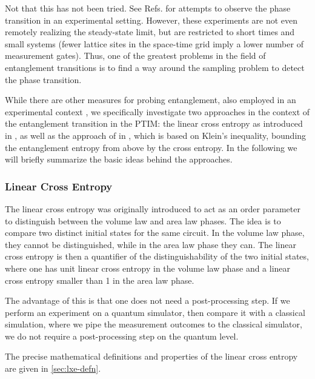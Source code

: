 Not that this has not been tried. See Refs.
\cite{noelMeasurementinducedQuantumPhases2022,kohExperimentalRealizationMeasurementInduced2022,kamakariExperimentalDemonstrationScalable2024}
for attempts to observe the phase transition in an experimental setting.
However, these experiments are not even remotely realizing the steady-state
limit, but are restricted to short times and small systems (fewer lattice sites
in the space-time grid imply a lower number of measurement gates). Thus, one of
the greatest problems in the field of entanglement transitions is to find a way
around the sampling problem to detect the phase transition.

While there are other measures for probing entanglement, also employed in an
experimental context
\cite{joshiObservingQuantumMpemba2024,aresEntanglementAsymmetryProbe2023}, we
specifically investigate two approaches in the context of the entanglement
transition in the PTIM: the linear cross entropy as introduced in
\cite{liCrossEntropyBenchmark2023}, as well as the approach of
\citeauthor{garrattProbingPostmeasurementEntanglement2023} in
\cite{garrattProbingPostmeasurementEntanglement2023}, which is based on Klein's
inequality, bounding the entanglement entropy from above by the cross entropy.
In the following we will briefly summarize the basic ideas behind the
approaches.

\subsubsection{Linear Cross Entropy}

The linear cross entropy was originally introduced to act as an order parameter
to distinguish between the volume law and area law phases. The idea is to
compare two distinct initial states for the same circuit. In the volume law
phase, they cannot be distinguished, while in the area law phase they can.  The
linear cross entropy is then a quantifier of the distinguishability of the two
initial states, where one has unit linear cross entropy in the volume law phase
and a linear cross entropy smaller than 1 in the area law phase. 

The advantage of this is that one does not need a post-processing step. If we
perform an experiment on a quantum simulator, then compare it with a
classical simulation, where we pipe the measurement outcomes to the classical
simulator, we do not require a post-processing step on the quantum level.

The precise mathematical definitions and properties of the linear cross entropy
are given in \cref{sec:lxe-defn}.

